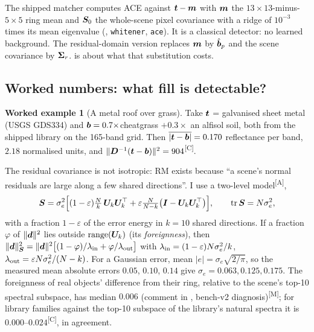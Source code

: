 \documentclass[11pt,a4paper]{article}
\theoremstyle{plain}
\theoremstyle{definition}
\newtheorem{example}[proposition]{Worked example}
\theoremstyle{remark}
\newcommand{\tr}{\operatorname{tr}}
\newcommand{\rng}{\operatorname{range}}
\newcommand{\bvec}{\B{b}}
\newcommand{\bh}{\hat{\B{b}}}
\newcommand{\tv}{\B{t}}
\newcommand{\dv}{\B{d}}
\newcommand{\Sm}{\B{S}}
\newcommand{\Um}{\B{U}}
\newcommand{\Dm}{\B{D}}
\newcommand{\Id}{\B{I}}
\newcommand{\nrm}[1]{\lVert #1\rVert}
\newcommand{\meas}{\textsuperscript{\textsf{\scriptsize[M]}}}
\newcommand{\comp}{\textsuperscript{\textsf{\scriptsize[C]}}}
\newcommand{\assm}{\textsuperscript{\textsf{\scriptsize[A]}}}
\begin{document}
The shipped matcher computes ACE against $\tv-\B m$ with $\bm{m}$ the $13\times13$-minus-$5\times5$ ring mean and
$\Sm_0$ the whole-scene pixel covariance with a ridge of $10^{-3}$ times its mean eigenvalue (,
\verb|whitener|, \verb|ace|). It is a classical detector: no learned background. The residual-domain version
replaces $\bm{m}$ by $\bh_p$ and the scene covariance by $\bm{\Sigma}_r$.  is about what that substitution
costs.

\subsection{Worked numbers: what fill is detectable?}

\begin{example}[A metal roof over grass]
\label{ex:metal}
Take $\tv$ = galvanised sheet metal (USGS GDS334) and $\bvec=0.7\times$cheatgrass $+0.3\times$ an alfisol soil, both
from the shipped library on the 165-band grid. Then $\overline{|\tv-\bvec|}=0.170$ reflectance per band,
$2.18$ normalised units, and $\nrm{\Dm^{-1}(\tv-\bvec)}^2=904$\comp.
\end{example}

The residual covariance is not isotropic: RM exists because ``a scene's normal residuals are large along a few shared
directions''. I use a two-level model\assm,
\[
  \Sm=\sigma_e^2\Big[(1-\varepsilon)\tfrac{N}{k}\,\Um_k\Um_k^\top+\varepsilon\tfrac{N}{N-k}\big(\Id-\Um_k\Um_k^\top\big)\Big],
  \qquad \tr\Sm=N\sigma_e^2,
\]
with a fraction $1-\varepsilon$ of the error energy in $k=10$ shared directions. If a fraction $\varphi$ of $\nrm{\dv}^2$
lies outside $\rng(\Um_k)$ (its \emph{foreignness}), then
$\nrm{\dv}^2_{\Sm}=\nrm{\dv}^2\big[(1-\varphi)/\lambda_{\rm in}+\varphi/\lambda_{\rm out}\big]$ with
$\lambda_{\rm in}=(1-\varepsilon)N\sigma_e^2/k$, $\lambda_{\rm out}=\varepsilon N\sigma_e^2/(N-k)$. For a Gaussian
error, mean $|e|=\sigma_e\sqrt{2/\pi}$, so the measured mean absolute errors $0.05$, $0.10$, $0.14$ give
$\sigma_e=0.063,0.125,0.175$. The foreignness of real objects' difference from their ring, relative to the scene's
top-10 spectral subspace, has median $0.006$ (comment in , bench-v2 diagnosis)\meas; for library
families against the top-10 subspace of the library's natural spectra it is $0.000$--$0.024$\comp, in agreement.
\end{document}
